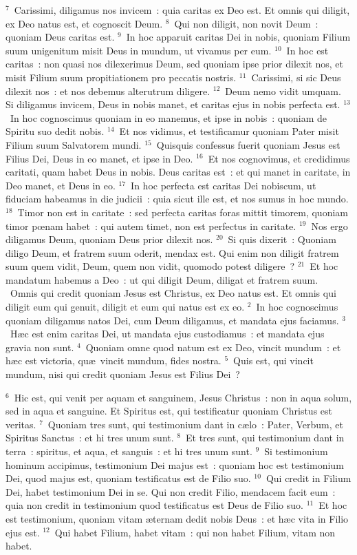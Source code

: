 ${}^{7}$~Carissimi, diligamus nos invicem~: quia caritas ex Deo est. Et omnis qui diligit, ex Deo natus est, et cognoscit Deum.
${}^{8}$~Qui non diligit, non novit Deum~: quoniam Deus caritas est.
${}^{9}$~In hoc apparuit caritas Dei in nobis, quoniam Filium suum unigenitum misit Deus in mundum, ut vivamus per eum.
${}^{10}$~In hoc est caritas~: non quasi nos dilexerimus Deum, sed quoniam ipse prior dilexit nos, et misit Filium suum propitiationem pro peccatis nostris.
${}^{11}$~Carissimi, si sic Deus dilexit nos~: et nos debemus alterutrum diligere.
${}^{12}$~Deum nemo vidit umquam. Si diligamus invicem, Deus in nobis manet, et caritas ejus in nobis perfecta est.
${}^{13}$~In hoc cognoscimus quoniam in eo manemus, et ipse in nobis~: quoniam de Spiritu suo dedit nobis.
${}^{14}$~Et nos vidimus, et testificamur quoniam Pater misit Filium suum Salvatorem mundi.
${}^{15}$~Quisquis confessus fuerit quoniam Jesus est Filius Dei, Deus in eo manet, et ipse in Deo.
${}^{16}$~Et nos cognovimus, et credidimus caritati, quam habet Deus in nobis. Deus caritas est~: et qui manet in caritate, in Deo manet, et Deus in eo.
${}^{17}$~In hoc perfecta est caritas Dei nobiscum, ut fiduciam habeamus in die judicii~: quia sicut ille est, et nos sumus in hoc mundo.
${}^{18}$~Timor non est in caritate~: sed perfecta caritas foras mittit timorem, quoniam timor pœnam habet~: qui autem timet, non est perfectus in caritate.
${}^{19}$~Nos ergo diligamus Deum, quoniam Deus prior dilexit nos.
${}^{20}$~Si quis dixerit~: Quoniam diligo Deum, et fratrem suum oderit, mendax est. Qui enim non diligit fratrem suum quem vidit, Deum, quem non vidit, quomodo potest diligere~?
${}^{21}$~Et hoc mandatum habemus a Deo~: ut qui diligit Deum, diligat et fratrem suum.
~Omnis qui credit quoniam Jesus est Christus, ex Deo natus est. Et omnis qui diligit eum qui genuit, diligit et eum qui natus est ex eo.
${}^{2}$~In hoc cognoscimus quoniam diligamus natos Dei, cum Deum diligamus, et mandata ejus faciamus.
${}^{3}$~H\ae c est enim caritas Dei, ut mandata ejus custodiamus~: et mandata ejus gravia non sunt.
${}^{4}$~Quoniam omne quod natum est ex Deo, vincit mundum~: et h\ae c est victoria, qu\ae\ vincit mundum, fides nostra.
${}^{5}$~Quis est, qui vincit mundum, nisi qui credit quoniam Jesus est Filius Dei~?


${}^{6}$~Hic est, qui venit per aquam et sanguinem, Jesus Christus~: non in aqua solum, sed in aqua et sanguine. Et Spiritus est, qui testificatur quoniam Christus est veritas.
${}^{7}$~Quoniam tres sunt, qui testimonium dant in c\ae lo~: Pater, Verbum, et Spiritus Sanctus~: et hi tres unum sunt.
${}^{8}$~Et tres sunt, qui testimonium dant in terra~: spiritus, et aqua, et sanguis~: et hi tres unum sunt.
${}^{9}$~Si testimonium hominum accipimus, testimonium Dei majus est~: quoniam hoc est testimonium Dei, quod majus est, quoniam testificatus est de Filio suo.
${}^{10}$~Qui credit in Filium Dei, habet testimonium Dei in se. Qui non credit Filio, mendacem facit eum~: quia non credit in testimonium quod testificatus est Deus de Filio suo.
${}^{11}$~Et hoc est testimonium, quoniam vitam \ae ternam dedit nobis Deus~: et h\ae c vita in Filio ejus est.
${}^{12}$~Qui habet Filium, habet vitam~: qui non habet Filium, vitam non habet.


